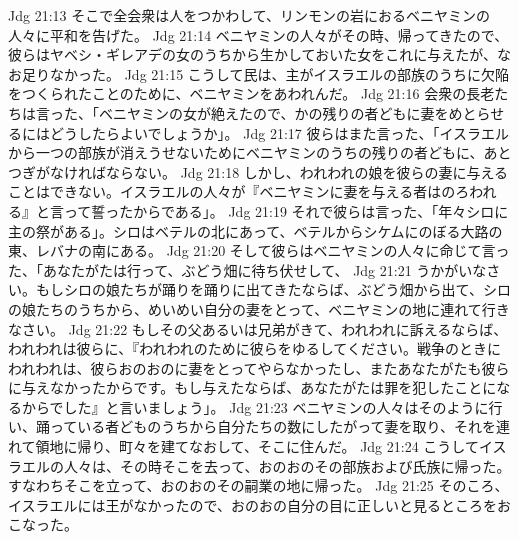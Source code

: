 Jdg 21:13  そこで全会衆は人をつかわして、リンモンの岩におるベニヤミンの人々に平和を告げた。
Jdg 21:14  ベニヤミンの人々がその時、帰ってきたので、彼らはヤベシ・ギレアデの女のうちから生かしておいた女をこれに与えたが、なお足りなかった。
Jdg 21:15  こうして民は、主がイスラエルの部族のうちに欠陥をつくられたことのために、ベニヤミンをあわれんだ。
Jdg 21:16  会衆の長老たちは言った、「ベニヤミンの女が絶えたので、かの残りの者どもに妻をめとらせるにはどうしたらよいでしょうか」。
Jdg 21:17  彼らはまた言った、「イスラエルから一つの部族が消えうせないためにベニヤミンのうちの残りの者どもに、あとつぎがなければならない。
Jdg 21:18  しかし、われわれの娘を彼らの妻に与えることはできない。イスラエルの人々が『ベニヤミンに妻を与える者はのろわれる』と言って誓ったからである」。
Jdg 21:19  それで彼らは言った、「年々シロに主の祭がある」。シロはベテルの北にあって、ベテルからシケムにのぼる大路の東、レバナの南にある。
Jdg 21:20  そして彼らはベニヤミンの人々に命じて言った、「あなたがたは行って、ぶどう畑に待ち伏せして、
Jdg 21:21  うかがいなさい。もしシロの娘たちが踊りを踊りに出てきたならば、ぶどう畑から出て、シロの娘たちのうちから、めいめい自分の妻をとって、ベニヤミンの地に連れて行きなさい。
Jdg 21:22  もしその父あるいは兄弟がきて、われわれに訴えるならば、われわれは彼らに、『われわれのために彼らをゆるしてください。戦争のときにわれわれは、彼らおのおのに妻をとってやらなかったし、またあなたがたも彼らに与えなかったからです。もし与えたならば、あなたがたは罪を犯したことになるからでした』と言いましょう」。
Jdg 21:23  ベニヤミンの人々はそのように行い、踊っている者どものうちから自分たちの数にしたがって妻を取り、それを連れて領地に帰り、町々を建てなおして、そこに住んだ。
Jdg 21:24  こうしてイスラエルの人々は、その時そこを去って、おのおのその部族および氏族に帰った。すなわちそこを立って、おのおのその嗣業の地に帰った。
Jdg 21:25  そのころ、イスラエルには王がなかったので、おのおの自分の目に正しいと見るところをおこなった。


